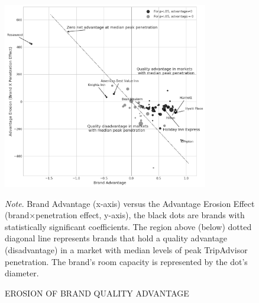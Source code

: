 \documentclass[mksc,blindrev]{informs3} %
\begin{document}
\begin{figure}[hp]
 \caption{EROSION OF BRAND QUALITY ADVANTAGE}
 \centering
  {\includegraphics[width=0.8\textwidth,height=\textheight,keepaspectratio]{./Figures/brand_coeff2.png} \label{fig:brandvspenetrate}}
  \\
  \begin{flushleft}
\small \textit{Note}. Brand Advantage (x-axis) versus the Advantage Erosion Effect (brand$\times$penetration effect, y-axis), the black dots are brands with statistically significant coefficients. The region above (below) dotted diagonal line represents brands that hold a quality advantage (disadvantage) in a market with median levels of peak TripAdvisor penetration. The brand's room capacity is represented by the dot's diameter. 
\end{flushleft}
\end{figure}
\clearpage



\ACKNOWLEDGMENT{%
}%


%
%
%
\end{document}
